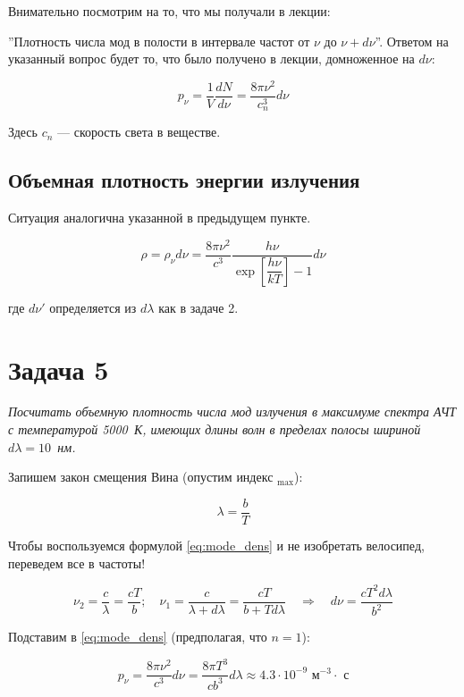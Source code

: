 \documentclass[a4paper, 12pt]{article}
\newcommand{\qrq}
{\ensuremath{\quad \Rightarrow \quad}} %
\begin{document}
Внимательно посмотрим на то, что мы получали в лекции:

''Плотность числа мод в полости в интервале частот от $\nu$ до $\nu + d\nu$''. Ответом на указанный вопрос будет то, что было получено в лекции, домноженное на $d\nu$:

\begin{equation}
	p_\nu = \frac{1}{V} \frac{d N}{d\nu} = \frac{8 \pi \nu^2}{c_n^3} d\nu
	\label{eq:mode_dens}
\end{equation}

Здесь $c_n$ --- скорость света в веществе.

\subsection{Объемная плотность энергии излучения}

Ситуация аналогична указанной в предыдущем пункте. 

\begin{equation}
	\rho = \rho_\nu d\nu =  \frac{8 \pi \nu^2}{c^3} \frac{h\nu}{\exp\left[\dfrac{h \nu }{k T}\right] - 1} d\nu
\end{equation}

где $d\nu'$ определяется из $d\lambda$ как в задаче 2.

\section{Задача 5}

\textit{Посчитать объемную плотность числа мод излучения в максимуме спектра АЧТ с температурой 5000~К, имеющих длины волн в пределах полосы шириной $d\lambda = 10$~нм.}

Запишем закон смещения Вина (опустим индекс $_\text{max}$):

\begin{equation}
	\lambda = \frac{b}{T}
\end{equation}

Чтобы воспользуемся формулой \ref{eq:mode_dens} и не изобретать велосипед, переведем все в частоты!

\begin{equation}
	\nu_2 = \frac{c}{\lambda} = \frac{c T}{b}; \quad \nu_1 = \frac{c}{\lambda + d\lambda} = \frac{c T}{b + T d\lambda} \qrq d\nu = \frac{c T^2 d\lambda}{b^2}
\end{equation}

Подставим в \ref{eq:mode_dens} (предполагая, что $n=1$):

\begin{equation}
	p_\nu =  \frac{8 \pi \nu^2}{c^3} d\nu = \frac{8\pi T^3}{c b^3} d\lambda \approx 4.3 \cdot 10^{-9} \text{ м$^{-3} \cdot$ с}
\end{equation}
\end{document}
